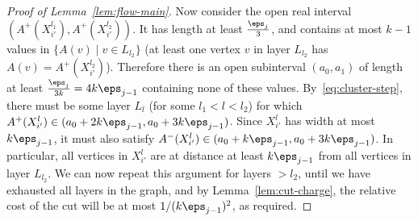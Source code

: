 \begin{proof}[Proof of Lemma~\ref{lem:flow-main}]
Now consider the open real interval $(A^+(X^{l_1}_{i'}),A^+(X^{l_2}_{i'}))$. It has length at least $\frac{\eps_j}3$, and contains at most $k-1$ values in $\{A(v)\mid v\in L_{l_2}\}$ (at least one vertex $v$ in layer $L_{l_2}$ has $A(v)=A^+(X^{l_2}_{i'})$). Therefore there is an open subinterval $(a_0,a_1)$ of length at least $\frac{\eps_j}{3k}=4k\eps_{j-1}$ containing none of these values. By~\eqref{eq:cluster-step}, there must be some layer $L_l$ (for some $l_1<l<l_2$) for which $A^+(X^l_{i'})\in(a_0+2k\eps_{j-1},a_0+3k\eps_{j-1})$. Since $X^l_{i'}$ has width at most $k\eps_{j-1}$, it must also satisfy $A^-(X^l_{i'})\in(a_0+k\eps_{j-1},a_0+3k\eps_{j-1})$. In particular, all vertices in $X^l_{i'}$ are at distance at least $k\eps_{j-1}$ from all vertices in layer $L_{l_2}$. We can now repeat this argument for layers $>l_2$, until we have exhausted all layers in the graph, and by Lemma~\ref{lem:cut-charge}, the relative cost of the cut will be at most $1/(k\eps_{j-1})^2$, as required.
\end{proof}

\fi

